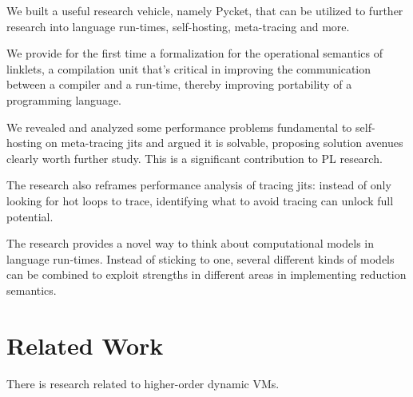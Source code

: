         \begin{paragraph-here}%
            We built a useful research vehicle, namely Pycket, that can be utilized to further research into language run-times, self-hosting, meta-tracing and more. %
        \end{paragraph-here}

        \begin{paragraph-here}%
            We provide for the first time a formalization for the operational semantics of linklets, a compilation unit that's critical in improving the communication between a compiler and a run-time, thereby improving portability of a programming language. %
        \end{paragraph-here}

        \begin{paragraph-here}%
            We revealed and analyzed some performance problems fundamental to self-hosting on meta-tracing \glspl{jit} and argued it is solvable, proposing solution avenues clearly worth further study.  This is a significant contribution to PL research. %
        \end{paragraph-here}

        \begin{paragraph-here}%
            The research also reframes performance analysis of tracing \glspl{jit}: instead of only looking for hot loops to trace, identifying what to avoid tracing can unlock full potential.
        \end{paragraph-here}

        \begin{paragraph-here}%
            The research provides a novel way to think about computational models in language run-times. Instead of sticking to one, several different kinds of models can be combined to exploit strengths in different areas in implementing reduction semantics. %
        \end{paragraph-here}

    \section{Related Work}
        \label{section:related-work}

        \begin{paragraph-here}%
             There is research related to higher-order dynamic VMs.
        \end{paragraph-here}

